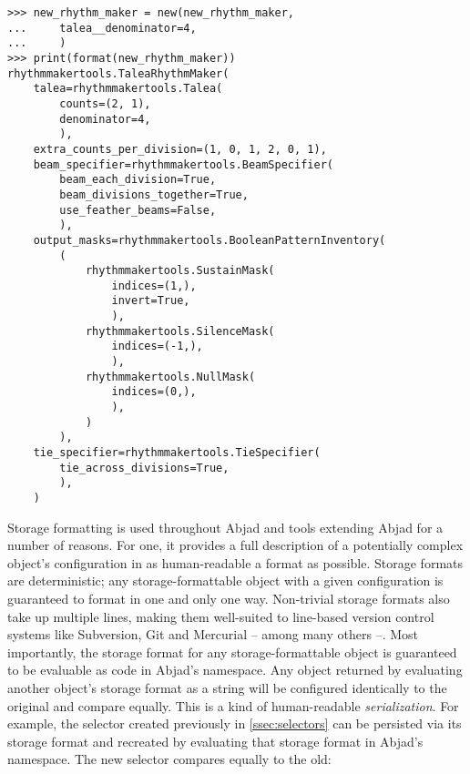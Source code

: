 \begin{abjadbookoutput}
\begin{singlespacing}
\vspace{-0.5\baselineskip}
\begin{verbatim}
>>> new_rhythm_maker = new(new_rhythm_maker,
...     talea__denominator=4,
...     )
>>> print(format(new_rhythm_maker))
rhythmmakertools.TaleaRhythmMaker(
    talea=rhythmmakertools.Talea(
        counts=(2, 1),
        denominator=4,
        ),
    extra_counts_per_division=(1, 0, 1, 2, 0, 1),
    beam_specifier=rhythmmakertools.BeamSpecifier(
        beam_each_division=True,
        beam_divisions_together=True,
        use_feather_beams=False,
        ),
    output_masks=rhythmmakertools.BooleanPatternInventory(
        (
            rhythmmakertools.SustainMask(
                indices=(1,),
                invert=True,
                ),
            rhythmmakertools.SilenceMask(
                indices=(-1,),
                ),
            rhythmmakertools.NullMask(
                indices=(0,),
                ),
            )
        ),
    tie_specifier=rhythmmakertools.TieSpecifier(
        tie_across_divisions=True,
        ),
    )
\end{verbatim}
\end{singlespacing}
\end{abjadbookoutput}

\noindent Storage formatting is used throughout Abjad and tools extending Abjad
for a number of reasons. For one, it provides a full description of a
potentially complex object's configuration in as human-readable a format as
possible. Storage formats are deterministic; any storage-formattable object
with a given configuration is guaranteed to format in one and only one way.
Non-trivial storage formats also take up multiple lines, making them
well-suited to line-based version control systems like Subversion, Git and
Mercurial -- among many others --. Most importantly, the storage format for any
storage-formattable object is guaranteed to be evaluable as code in Abjad's
namespace. Any object returned by evaluating another object's storage format as
a string will be configured identically to the original and compare equally.
This is a kind of human-readable \emph{serialization}. For example, the
selector created previously in \autoref{ssec:selectors} can be persisted via
its storage format and recreated by evaluating that storage format in Abjad's
namespace. The new selector compares equally to the old:

\begin{comment}
<abjad>
print(format(selector))
selector_format = format(selector)
evaluated_selector = eval(selector_format)
evaluated_selector == selector
</abjad>
\end{comment}

